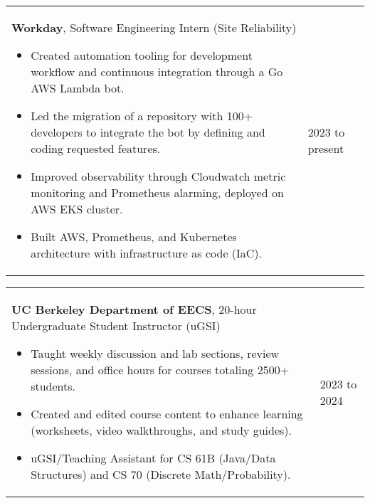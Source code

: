 \documentclass[10pt, a4paper]{article}
\newenvironment{highlights}{
        \begin{itemize}[
                topsep=0pt,
                parsep=0.10 cm,
                partopsep=0pt,
                itemsep=0pt,
                after=\vspace{-1\baselineskip},
                leftmargin=0.4 cm + 3pt
            ]
    }{
        \end{itemize}
    } %
\begin{document}
        \begin{tabularx}{ cm-0.13cm}{K{0.2 cm} R{4.1 cm}}
            \textbf{Workday}, Software Engineering Intern (Site Reliability)
            \vspace{0.10 cm}
            \begin{highlights}
                \item Created automation tooling for development workflow and continuous integration through a Go AWS Lambda bot. 
                \item Led the migration of a repository with 100+ developers to integrate the bot by defining and coding requested features. 
                \item Improved observability through Cloudwatch metric monitoring and Prometheus alarming, deployed on AWS EKS cluster. 
                \item Built AWS, Prometheus, and Kubernetes architecture with infrastructure as code (IaC). \hspace*{-0.2cm}
            \end{highlights}
        &
            2023 to present
        \end{tabularx}

        \vspace{0.12 cm}
        \begin{tabularx}{ cm-0.13cm}{K{0.2 cm} R{4.1 cm}}
            \textbf{UC Berkeley Department of EECS}, 20-hour Undergraduate Student Instructor (uGSI)
            \vspace{0.10 cm}
            \begin{highlights}
                \item Taught weekly discussion and lab sections, review sessions, and office hours for courses totaling 2500+ students. 
                \item Created and edited course content to enhance learning (worksheets, video walkthroughs, and study guides). 
                \item uGSI/Teaching Assistant for CS 61B (Java/Data Structures) and CS 70 (Discrete Math/Probability). \hspace*{-0.2cm}
            \end{highlights}
        &
            2023 to 2024
        \end{tabularx}
\end{document}
